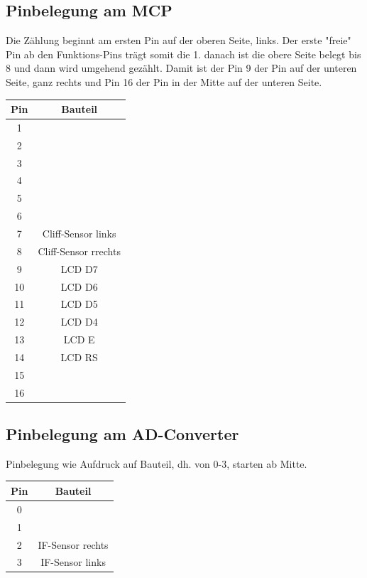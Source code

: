 \documentclass[a4paper,cleardoubleempty,BCOR1cm]{book}
\begin{document}
\subsection{Pinbelegung am MCP}
Die Zählung beginnt am ersten Pin auf der oberen Seite, links. Der erste "freie" Pin ab den Funktions-Pins trägt somit die 1. danach ist die obere Seite belegt bis 8 und dann wird umgehend gezählt. Damit ist der Pin 9 der Pin auf der unteren Seite, ganz rechts und Pin 16 der Pin in der Mitte auf der unteren Seite. 

\begin{center}
	\begin{tabular}{|c|c|}
		\hline
		Pin 	& Bauteil\\
		\hline
		1		&  \\
		2 		& \\
		3		& \\
		4		& 	\\
		5		& 	\\
		6		& 	\\
		7		& Cliff-Sensor links\\
		8		& Cliff-Sensor rrechts\\
		9		& LCD D7		\\
		10		& LCD D6 	\\
		11		& LCD D5		\\
		12		& LCD D4	\\
		13		& LCD E	\\	
		14		& LCD RS	\\
		15		& 	\\
		16		& 		\\
		\hline
	\end{tabular}
\end{center}

\subsection{Pinbelegung am AD-Converter}
Pinbelegung wie Aufdruck auf Bauteil, dh. von 0-3, starten ab Mitte.

\begin{center}
	\begin{tabular}{|c|c|}
		\hline
		Pin 	& Bauteil\\
		\hline
		0		& 	\\
		1		&  \\
		2 		& IF-Sensor rechts\\
		3		& IF-Sensor links\\
		\hline
	\end{tabular}
\end{center}
\end{document}

